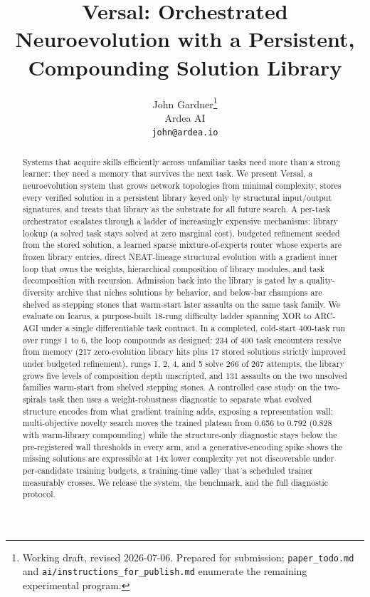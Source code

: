 \documentclass[11pt]{article}
\title{Versal: Orchestrated Neuroevolution with a Persistent, Compounding Solution Library}
\author{John Gardner\thanks{Working draft, revised 2026-07-06. Prepared for submission; \texttt{paper\_todo.md} and \texttt{ai/instructions\_for\_publish.md} enumerate the remaining experimental program.} \\
Ardea AI \\
\texttt{john@ardea.io}}
\date{}
\begin{document}
\maketitle

\begin{abstract}
Systems that acquire skills efficiently across unfamiliar tasks need more than a strong learner: they need a memory that survives the next task. We present Versal, a neuroevolution system that grows network topologies from minimal complexity, stores every verified solution in a persistent library keyed only by structural input/output signatures, and treats that library as the substrate for all future search. A per-task orchestrator escalates through a ladder of increasingly expensive mechanisms: library lookup (a solved task stays solved at zero marginal cost), budgeted refinement seeded from the stored solution, a learned sparse mixture-of-experts router whose experts are frozen library entries, direct NEAT-lineage structural evolution with a gradient inner loop that owns the weights, hierarchical composition of library modules, and task decomposition with recursion. Admission back into the library is gated by a quality-diversity archive that niches solutions by behavior, and below-bar champions are shelved as stepping stones that warm-start later assaults on the same task family. We evaluate on Icarus, a purpose-built 18-rung difficulty ladder spanning XOR to ARC-AGI under a single differentiable task contract. In a completed, cold-start 400-task run over rungs 1 to 6, the loop compounds as designed: 234 of 400 task encounters resolve from memory (217 zero-evolution library hits plus 17 stored solutions strictly improved under budgeted refinement), rungs 1, 2, 4, and 5 solve 266 of 267 attempts, the library grows five levels of composition depth unscripted, and 131 assaults on the two unsolved families warm-start from shelved stepping stones. A controlled case study on the two-spirals task then uses a weight-robustness diagnostic to separate what evolved structure encodes from what gradient training adds, exposing a representation wall: multi-objective novelty search moves the trained plateau from 0.656 to 0.792 (0.828 with warm-library compounding) while the structure-only diagnostic stays below the pre-registered wall thresholds in every arm, and a generative-encoding spike shows the missing solutions are expressible at 14x lower complexity yet not discoverable under per-candidate training budgets, a training-time valley that a scheduled trainer measurably crosses. We release the system, the benchmark, and the full diagnostic protocol.
\end{abstract}
\end{document}
